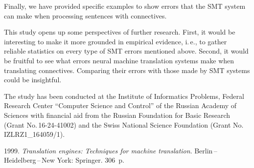 \begin{multicols}{2}
  Finally, we have provided specific examples to show errors that the SMT 
system can make when processing sentences with connectives.
  
  This study opens up some perspectives of further research. First, it would be 
interesting to make it more grounded in empirical evidence, i.\,e., to gather reliable 
statistics on every type of SMT errors mentioned above. Second, it would be 
fruitful to see what errors neural machine translation systems make when 
translating connectives. Comparing their errors with those made by SMT systems 
could be insightful.

  
  \Ack
  
    
  \noindent
   The study has been conducted at the Institute of Informatics Problems, Federal Research Center 
``Computer Science and Control'' of the Russian Academy of Sciences with financial aid from the Russian 
Foundation for Basic Research (Grant No.\,16-24-41002) and the Swiss National Science Foundation 
(Grant No.\,IZLRZ1\_164059/1).
  
\renewcommand{\bibname}{\protect\rmfamily References}




{\small\frenchspacing
{\baselineskip=10.65pt
\begin{thebibliography}{99}

 1999. \textit{Translation engines: Techniques for machine 
translation}. Berlin\,--\,Heidelberg\,--\,New York: Springer. 306~p.


\end{thebibliography}}}
\end{multicols}
